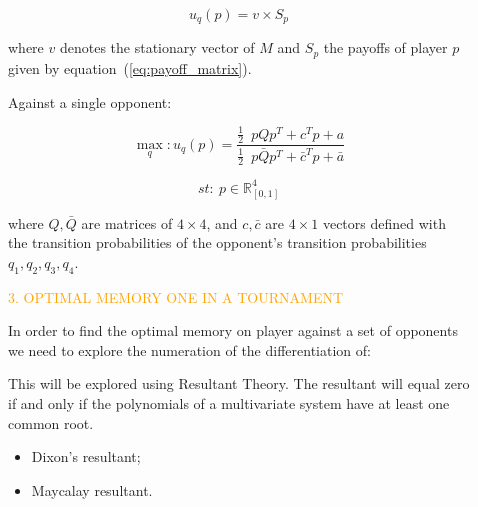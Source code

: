 \documentclass[usenames,dvipsnames,t]{beamer}
\newcommand{\R}{\mathbb{R}}
\begin{document}
\begin{columns}
\begin{column}{.4\linewidth}
            \[u_q(p) = v \times S_{p}\]
            \vspace{0.3cm}

        where \(v\) denotes the stationary vector of \(M\) and \(S_{p}\) the payoffs of
        player \(p\) given by equation~(\ref{eq:payoff_matrix}).
        \vspace{0.5cm}

        \textcolor{solarizedGreen}{Against a single opponent:}
        \vspace{0.3cm}

        \[\max_q: u_q(p) = \frac{\frac{1}{2}\enspace p  Q  p^T + c^T p + a} 
                        {\frac{1}{2}\enspace  p  \bar{Q}  p^T + \bar{c}^T  p + \bar{a}}\]

         \[st:  \ p \in \R^4_{[0, 1]}\]
         \vspace{0.3cm}

        \small{
        where \(Q, \bar{Q}\) are matrices of \(4 \times 4\), and \(c, \bar{c}\) are 
        \(4 \times 1\) vectors  defined with the transition probabilities of the
        opponent's transition probabilities \(q_1, q_2, q_3, q_4\).}
    \vspace{2cm}

    \textcolor{orange}{\large{3. OPTIMAL MEMORY ONE IN A TOURNAMENT}}
    \vspace{0.3cm}

    \small{
        In order to find the optimal memory on player against a set of opponents
        we need to explore the numeration of the differentiation of:
        
        This will be explored using Resultant Theory. The resultant will equal
        zero if and only if the polynomials of a multivariate system have at least
        one common root.
    }
    \small{
        \begin{itemize}
            \item Dixon's resultant;
            \item Maycalay resultant.
        \end{itemize}
    }
    \end{column}

    \begin{column}{.05\linewidth}
    \end{column}
    \begin{column}{.45\linewidth}
        \vspace{0.9cm}
    

\end{column}
\end{columns}
\end{document}
